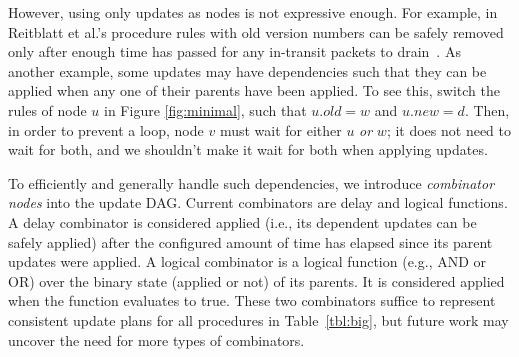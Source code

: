 However, using only updates as nodes is not expressive enough. For example, in Reitblatt et al.'s procedure rules with old version numbers can be safely removed only after enough time has passed for any in-transit packets to drain~\cite{safeupdate}. As another example, some updates may have dependencies such that they can be applied when any one of their parents have been applied. To see this, switch the rules of node $u$ in Figure \ref{fig:minimal}, such that $u.old = w$ and $u.new = d$. Then, in order to prevent a loop, node $v$ must wait  for either $u$ \emph{or} $w$; it does not need to wait for both, and we shouldn't make it wait for both when applying updates.

%


To efficiently and generally handle such dependencies, we introduce {\em combinator nodes} into the update DAG. Current combinators are delay and logical functions. A delay combinator is considered applied (i.e., its dependent updates can be safely applied) after the configured amount of time has elapsed since its parent updates were applied. A logical combinator is a logical function (e.g., AND or OR) over the binary state (applied or not) of its parents. It is considered applied when the function evaluates to true. These two combinators suffice to represent consistent update plans for all procedures in Table~\ref{tbl:big}, but future work may uncover the need for more types of combinators.

